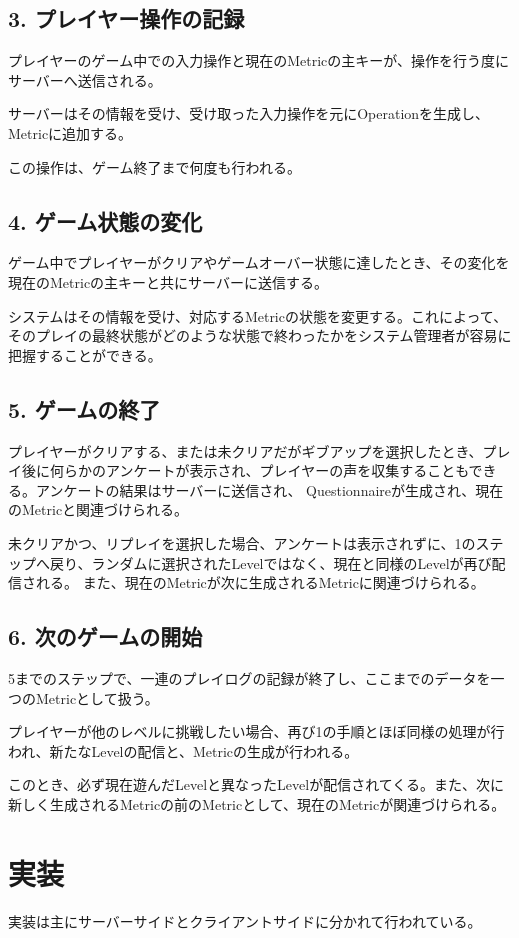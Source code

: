 \subsection{3. プレイヤー操作の記録}
プレイヤーのゲーム中での入力操作と現在のMetricの主キーが、操作を行う度にサーバーへ送信される。

サーバーはその情報を受け、受け取った入力操作を元にOperationを生成し、Metricに追加する。

この操作は、ゲーム終了まで何度も行われる。

\subsection{4. ゲーム状態の変化}
ゲーム中でプレイヤーがクリアやゲームオーバー状態に達したとき、その変化を現在のMetricの主キーと共にサーバーに送信する。

システムはその情報を受け、対応するMetricの状態を変更する。これによって、そのプレイの最終状態がどのような状態で終わったかをシステム管理者が容易に把握することができる。


\subsection{5. ゲームの終了}
プレイヤーがクリアする、または未クリアだがギブアップを選択したとき、プレイ後に何らかのアンケートが表示され、プレイヤーの声を収集することもできる。アンケートの結果はサーバーに送信され、
Questionnaireが生成され、現在のMetricと関連づけられる。


未クリアかつ、リプレイを選択した場合、アンケートは表示されずに、1のステップへ戻り、ランダムに選択されたLevelではなく、現在と同様のLevelが再び配信される。
また、現在のMetricが次に生成されるMetricに関連づけられる。

\subsection{6. 次のゲームの開始}
5までのステップで、一連のプレイログの記録が終了し、ここまでのデータを一つのMetricとして扱う。

プレイヤーが他のレベルに挑戦したい場合、再び1の手順とほぼ同様の処理が行われ、新たなLevelの配信と、Metricの生成が行われる。

このとき、必ず現在遊んだLevelと異なったLevelが配信されてくる。また、次に新しく生成されるMetricの前のMetricとして、現在のMetricが関連づけられる。


\section{実装}
実装は主にサーバーサイドとクライアントサイドに分かれて行われている。

